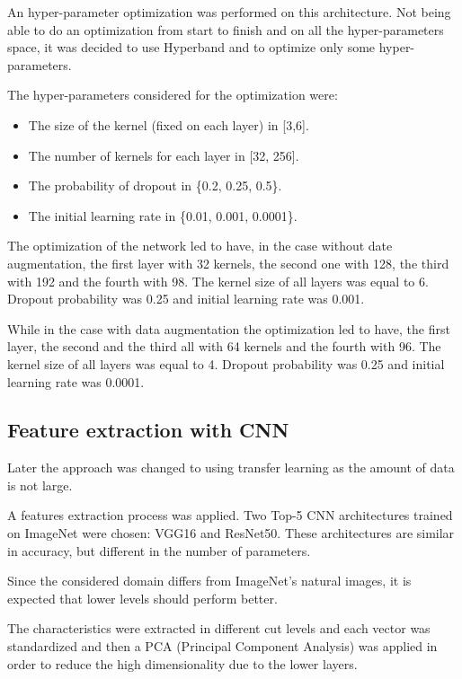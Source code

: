 An hyper-parameter optimization was performed on this architecture.
Not being able to do an optimization from start to finish and on all the hyper-parameters space,
it was decided to use Hyperband \cite{li2016novel} and to optimize only some hyper-parameters.

The hyper-parameters considered for the optimization were:
\begin{itemize}
    \item The size of the kernel (fixed on each layer) in [3,6].
    \item The number of kernels for each layer in [32, 256].
    \item The probability of dropout in \{0.2, 0.25, 0.5\}.
    \item The initial learning rate in \{0.01, 0.001, 0.0001\}.
\end{itemize}

The optimization of the network led to have, in the case without date augmentation, the first layer with 32 kernels, the second one with 128, the third with 192 and the fourth with 98. The kernel size of all layers was equal to 6.
Dropout probability was 0.25 and initial learning rate was 0.001.

While in the case with data augmentation the optimization led to have, the first layer, the second and the third all with 64 kernels and the fourth with 96.
The kernel size of all layers was equal to 4. Dropout probability was 0.25 and initial learning rate was 0.0001.

\subsection{Feature extraction with CNN}
Later the approach was changed to using transfer learning as the amount of data is not large.

A features extraction process was applied. Two Top-5 CNN architectures trained on ImageNet were chosen: VGG16 and ResNet50. These architectures are similar in accuracy, but different in the number of parameters.

Since the considered domain differs from ImageNet's natural images, it is expected that lower levels should perform better.

\vspace{5mm}
\noindent
The characteristics were extracted in different cut levels and each vector was standardized and then a PCA (Principal Component Analysis) was applied in order to reduce the high dimensionality due to the lower layers.

